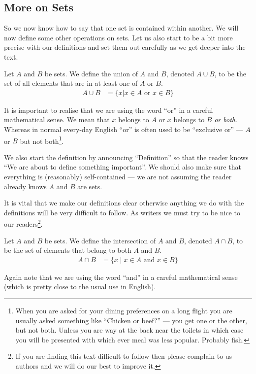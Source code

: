 \subsection*{More on Sets}
So we now know how to say that one set is contained within another. We will now
define some other operations on sets. Let us also start to be a bit more precise
with our definitions and set them out carefully as we get deeper into the
text.
\begin{defn}
 Let $A$ and $B$ be sets. We define the union of $A$ and $B$, denoted $A \cup
B$, to be the set of all elements that are in at least one of $A$ or $B$.
\begin{align*}
  A \cup B &= \{x | x\in A \mbox{ or } x \in B \}
\end{align*}
\end{defn}
It is important to realise that we are using the word ``or'' in a careful
mathematical sense. We mean that $x$ belongs to $A$ or $x$ belongs to $B$
\emph{or both}. Whereas in normal every-day English ``or'' is often used to be
``exclusive or'' --- $A$ or $B$ but not both\footnote{When you are asked for
your dining preferences on a long flight you are usually asked something
like ``Chicken or beef?'' --- you get one or the other, but not both. Unless
you are way at the back near the toilets in which case you will be presented
with which ever meal was less popular. Probably fish.}.

We also start the definition by announcing ``Definition''
so that the reader knows ``We are about to define something important''. We
should also make sure that everything is (reasonably) self-contained --- we are
not assuming the reader already knows $A$ and $B$ are sets.

It is vital that we make our definitions clear otherwise anything we do with the
definitions will be very difficult to follow. As writers we must try to be nice
to our readers\footnote{If you are finding this text difficult to follow then
please complain to us authors and we will do our best to improve it.}.

\begin{defn}
 Let $A$ and $B$ be sets. We define the intersection of $A$ and $B$, denoted $A
\cap B$, to be the set of elements that belong to both $A$ and $B$.
\begin{align*}
 A \cap B &= \{ x \;|\; x\in A \mbox{ and } x \in B \}
\end{align*}
\end{defn}
Again note that we are using the word ``and'' in a careful mathematical sense
(which is pretty close to the usual use in English).

